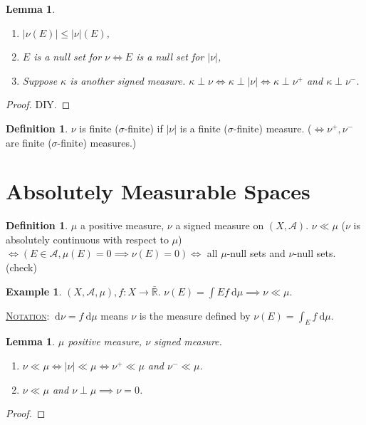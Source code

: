 \documentclass{report}
\newcommand{\R}{\mathbb{R}}
\newcommand{\cA}{\mathcal{A}}
\newcommand{\df}{\ \mathrm{d}}
\newcommand{\fancyem}[1]{\underline{\textsc{#1}}}
\newtheorem{lemma}[theorem]{Lemma}
\theoremstyle{definition}
\newtheorem{definition}[theorem]{Definition}
\newtheorem{example}[theorem]{Example}
\theoremstyle{remark}
\begin{document}
\begin{lemma}
	\begin{enumerate}
		\item $|\nu(E)| \leq |\nu|(E)$,
		\item $E$ is a null set for $\nu \iff E$ is a null set for $|\nu|$,
		\item Suppose $\kappa$ is another signed measure. $\kappa \perp \nu \iff \kappa \perp |\nu| \iff \kappa \perp \nu^+$ and $\kappa \perp \nu^-$.
	\end{enumerate}
\end{lemma}
\begin{proof}
	DIY.
\end{proof}

\begin{definition}
	$\nu$ is finite ($\sigma$-finite) if $|\nu|$ is a finite ($\sigma$-finite) measure. ($\iff \nu^+, \nu^-$ are finite ($\sigma$-finite) measures.)
\end{definition}

\section{Absolutely Measurable Spaces}
\begin{definition}
	$\mu$ a positive measure, $\nu$ a signed measure on $(X, \cA)$. $\nu \ll \mu$ ($\nu$ is absolutely continuous with respect to $\mu$) $\iff (E \in \cA, \mu(E) = 0 \implies \nu(E) = 0) \iff $ all $\mu$-null sets and $\nu$-null sets. (check)
\end{definition}
\begin{example}
	$(X, \cA, \mu), f: X \to \bar{\R}$. $\nu(E) = \int E f \df \mu \implies \nu \ll \mu$.
\end{example}
\fancyem{Notation}: $\df \nu = f \df \mu$ means $\nu$ is the measure defined by $\nu(E) = \int_E f \df \mu$.

\begin{lemma}
	$\mu$ positive measure, $\nu$ signed measure.
	\begin{enumerate}
		\item $\nu \ll \mu \iff |\nu| \ll \mu \iff \nu^+ \ll \mu$ and $\nu^- \ll \mu$.
		\item $\nu \ll \mu$ and $\nu \perp \mu \implies \nu = 0$. 
	\end{enumerate}
\end{lemma}
\begin{proof}
	
\end{proof}
\end{document}
